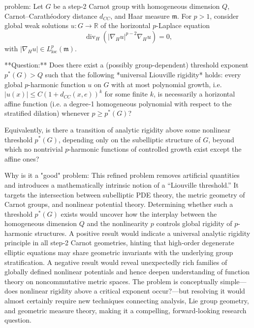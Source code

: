 problem:  
Let \(G\) be a step‑2 Carnot group with homogeneous dimension \(Q\), Carnot–Carathéodory distance \(d_{CC}\), and Haar measure \(\mathfrak{m}\). For \(p>1\), consider global weak solutions \(u:G\to\mathbb{R}\) of the horizontal \(p\)-Laplace equation  
\[
\operatorname{div}_H(|\nabla_H u|^{p-2}\nabla_H u) = 0,
\]
with \(|\nabla_H u|\in L^p_{\mathrm{loc}}(\mathfrak{m})\).  

**Question:**  
Does there exist a (possibly group-dependent) threshold exponent \(p^*(G)>Q\) such that the following *universal Liouville rigidity* holds: every global \(p\)-harmonic function \(u\) on \(G\) with at most polynomial growth, i.e. \( |u(x)|\le C(1+d_{CC}(x,e))^k \) for some finite \(k\), is necessarily a horizontal affine function (i.e. a degree‑1 homogeneous polynomial with respect to the stratified dilation) whenever \(p\ge p^*(G)\)?  

Equivalently, is there a transition of analytic rigidity above some nonlinear threshold \(p^*(G)\), depending only on the subelliptic structure of \(G\), beyond which no nontrivial \(p\)-harmonic functions of controlled growth exist except the affine ones?  

Why is it a "good" problem:  
This refined problem removes artificial quantities and introduces a mathematically intrinsic notion of a “Liouville threshold.” It targets the intersection between subelliptic PDE theory, the metric geometry of Carnot groups, and nonlinear potential theory. Determining whether such a threshold \(p^*(G)\) exists would uncover how the interplay between the homogeneous dimension \(Q\) and the nonlinearity \(p\) controls global rigidity of \(p\)-harmonic structures. A positive result would indicate a universal analytic rigidity principle in all step‑2 Carnot geometries, hinting that high‑order degenerate elliptic equations may share geometric invariants with the underlying group stratification. A negative result would reveal unexpectedly rich families of globally defined nonlinear potentials and hence deepen understanding of function theory on noncommutative metric spaces. The problem is conceptually simple—does nonlinear rigidity above a critical exponent occur?—but resolving it would almost certainly require new techniques connecting analysis, Lie group geometry, and geometric measure theory, making it a compelling, forward-looking research question.